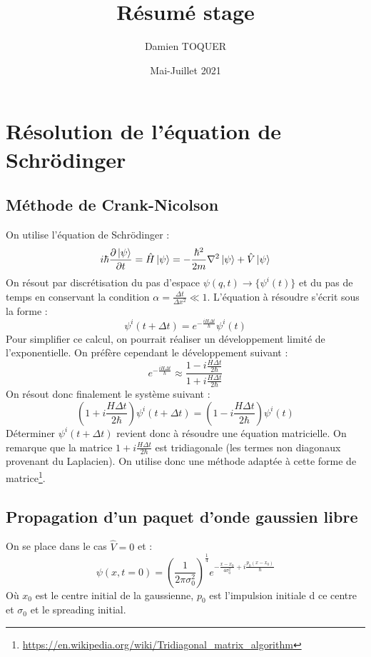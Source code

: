 \documentclass[11pt, a4paper, twocolumn]{article}
\title{Résumé stage}
\author{Damien TOQUER}
\date{Mai-Juillet 2021}
\begin{document}
\maketitle

\tableofcontents

\section{Résolution de l'équation de Schrödinger}
\subsection{Méthode de Crank-Nicolson}
On utilise l'équation de Schrödinger :
\begin{equation}
	i\hbar\frac{\partial\ket{\psi}}{\partial t} = \hat{H}\ket{\psi} = -\frac{\hbar^2}{2m}\nabla^2\ket{\psi}+\hat{V}\ket{\psi}
\end{equation}
On résout par discrétisation du pas d'espace $\psi(q, t) \rightarrow \{\psi^i(t)\}$ et du pas de temps en conservant la condition $\alpha = \frac{\Delta t}{\Delta x^2}\ll1$. L'équation à résoudre s'écrit sous la forme :
\begin{equation}
	\psi^i(t+\Delta t) = e^{-\frac{iH\Delta t}{\hbar}}\psi^i(t)
\end{equation}
Pour simplifier ce calcul, on pourrait réaliser un développement limité de l'exponentielle. On préfère cependant le développement suivant :
\begin{equation}
	e^{-\frac{iH\Delta t}{\hbar}}\approx\frac{1-i\frac{H\Delta t}{2\hbar}}{1+i\frac{H\Delta t}{2\hbar}}
\end{equation}
On résout donc finalement le système suivant :
\begin{equation}
	\left(1+i\frac{H\Delta t}{2\hbar}\right)\psi^i(t+\Delta t) = \left(1-i\frac{H\Delta t}{2\hbar}\right)\psi^i(t)
\end{equation}
Déterminer $\psi^i(t+\Delta t)$ revient donc à résoudre une équation matricielle. On remarque que la matrice $1+i\frac{H\Delta t}{2\hbar}$ est tridiagonale (les termes non diagonaux provenant du Laplacien). On utilise donc une méthode adaptée à cette forme de matrice\footnote{\url{https://en.wikipedia.org/wiki/Tridiagonal_matrix_algorithm}}.
\subsection{Propagation d'un paquet d'onde gaussien libre}
On se place dans le cas $\hat{V} = 0$ et :
\begin{equation}
	\psi(x, t=0) = \left(\frac{1}{2\pi\sigma_0^2}\right)^{\frac{1}{4}}e^{-\frac{x-x_0}{4\sigma_0^2}+i\frac{p_0(x-x_0)}{\hbar}}
\end{equation}
Où $x_0$ est le centre initial de la gaussienne, $p_0$ est l'impulsion initiale d ce centre et $\sigma_0$ et le spreading initial. 
\end{document}
